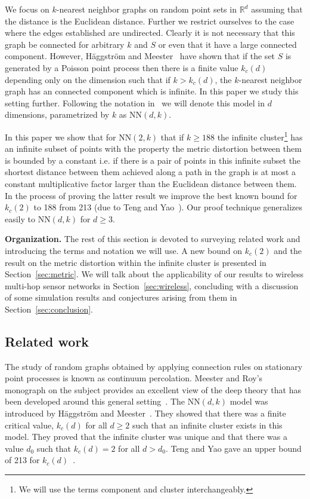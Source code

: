 \documentclass[11pt]{article}
\def\RR{\mathbb{R}}
\def\NN{\mbox{NN}}
\begin{document}
We focus on $k$-nearest neighbor graphs on random point sets in
$\RR^d$ assuming that the distance is the Euclidean distance. Further
we restrict ourselves to the case where the edges established are
undirected. Clearly it is not necessary that this graph be connected
for arbitrary $k$ and $S$ or even that it have a large connected
component. However, H\"aggstr\"om and
Meester~\cite{haggstrom-rsa:1996} have shown that if the set $S$ is
generated by a Poisson point process then there is a finite value
$k_c(d)$ depending only on the dimension such that if $k > k_c(d)$,
the $k$-nearest neighbor graph has an connected component which is
infinite. In this paper we study this setting further. Following the
notation in~\cite{haggstrom-rsa:1996} we will denote this model in $d$
dimensions, parametrized by $k$ as $\NN(d,k)$.

In this paper we show that for $\NN(2,k)$ that if $k \geq 188$ the
infinite cluster\footnote{We will use the terms component and cluster
interchangeably.} has an infinite subset of points with the property
the metric distortion between them is bounded by a constant i.e. if
there is a pair of points in this infinite subset the shortest
distance between them achieved along a path in the graph is at most a
constant multiplicative factor larger than the Euclidean distance
between them. In the process of proving the latter result we improve
the best known bound for $k_c(2)$ to 188 from 213 (due to Teng and
Yao~\cite{teng-algorithmica:2007}).  Our proof technique generalizes
easily to $\NN(d,k)$ for $d \geq 3$.  

{\bf Organization.} The rest of this section is devoted to surveying
related work and introducing the terms and notation we will use. A new
bound on $k_c(2)$ and the result on the metric distortion within the
infinite cluster is presented in Section~\ref{sec:metric}. We will
talk about the applicability of our results to wireless multi-hop
sensor networks in Section~\ref{sec:wireless}, concluding with a
discussion of some simulation results and conjectures arising from
them in Section~\ref{sec:conclusion}.

\subsection{Related work}
\label{sec:intro:related}

The study of random graphs obtained by applying connection rules on
stationary point processes is known as continuum percolation. Meester
and Roy's monograph on the subject provides an excellent view of the
deep theory that has been developed around this general
setting~\cite{meester:1996}. The $\NN(d,k)$ model was introduced by
H\"aggstr\"om and Meester~\cite{haggstrom-rsa:1996}. They showed that
there was a finite critical value, $k_c(d)$ for all $d \geq 2$ such
that an infinite cluster exists in this model. They proved that the
infinite cluster was unique and that there was a value $d_0$ such that
$k_c(d) = 2$ for all $d > d_0$. Teng and Yao gave an upper bound of
213 for $k_c(d)$~\cite{teng-algorithmica:2007}.
\end{document}
